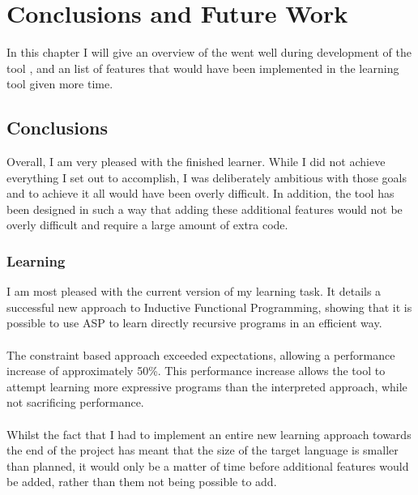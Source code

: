 \chapter{Conclusions and Future Work}

In this chapter I will give an overview of the went well during development of the tool , and an list of features that would have been implemented in the learning tool given more time.

\section{Conclusions}
Overall, I am very pleased with the finished learner. While I did not achieve everything I set out to accomplish, I was deliberately ambitious with those goals and to achieve it all would have been overly difficult.  In addition, the tool has been designed in such a way that adding these additional features would not be overly difficult and require a large amount of extra code.

\subsection{Learning}
I am most pleased with the current version of my learning task. It details a successful new approach to Inductive Functional Programming, showing that it is possible to use ASP to learn directly recursive programs in an efficient way.\\ \\
The constraint based approach exceeded expectations, allowing a performance increase of approximately 50\%. This performance increase allows the tool to attempt learning more expressive programs than the interpreted approach, while not sacrificing performance.\\ \\
Whilst the fact that I had to implement an entire new learning approach towards the end of the project has meant that the size of the target language is smaller than planned, it would only be a matter of time before additional features would be added, rather than them not being possible to add.

